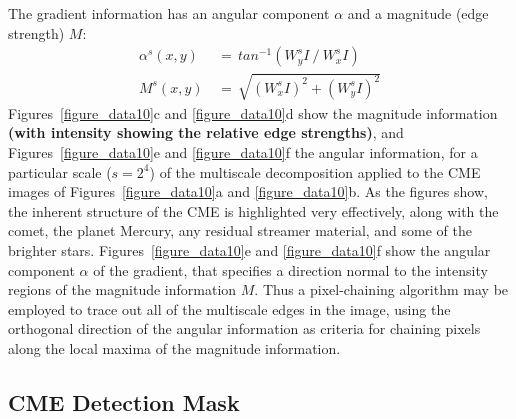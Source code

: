 \documentclass[preprint2]{aastex}
\begin{document}
The gradient information has an angular component $\alpha$ and a magnitude (edge strength) $M$:
\begin{eqnarray}
\alpha^s(x,y) \, &= \, tan^{-1}\left( W_{y}^s I~/~W_{x}^s I \right) \\
M^s(x,y) \, &= \, \sqrt{ ( W_{x}^s I ) ^2 + ( W_{y}^s I ) ^2 }
\end{eqnarray}
Figures~\ref{figure_data10}c and \ref{figure_data10}d show the magnitude information {\bf (with intensity showing the relative edge strengths)}, and Figures~\ref{figure_data10}e and \ref{figure_data10}f the angular information, for a particular scale ($s=2^{4}$) of the multiscale decomposition applied to the CME images of Figures~\ref{figure_data10}a and \ref{figure_data10}b. As the figures show, the inherent structure of the CME is highlighted very effectively, along with the comet, the planet Mercury, any residual streamer material, and some of the brighter stars. Figures~\ref{figure_data10}e and \ref{figure_data10}f show the angular component $\alpha$ of the gradient, that specifies a direction normal to the intensity regions of the magnitude information $M$. Thus a pixel-chaining algorithm may be employed to trace out all of the multiscale edges in the image, using the orthogonal direction of the angular information as criteria for chaining pixels along the local maxima of the magnitude information.


\subsection{CME Detection Mask}
\label{sect_detectionmask}
\end{document}

